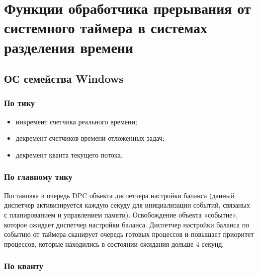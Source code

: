 \setcounter{page}{2}
\chapter{Функции обработчика прерывания от системного таймера в системах разделения времени}


%
%

\section{ОС семейства Windows}

\subsection*{По тику}
\begin{itemize}[label=---]
	\item инкремент счетчика реального времени;
	\item декремент счетчиков времени отложенных задач;
	\item декремент кванта текущего потока. %
\end{itemize}

\subsection*{По главному тику}
Постановка в очередь DPC объекта диспетчера настройки баланса (данный диспетчер активизируется каждую секуду для инициализации событий, связаных с планированием и управлением памяти).
Освобождение объекта «событие», которое ожидает диспетчер настройки баланса. Диспетчер настройки баланса по событию от таймера сканирует очередь готовых процессов и повышает приоритет процессов, которые находились в состоянии ожидания дольше 4 секунд.


\subsection*{По кванту}

